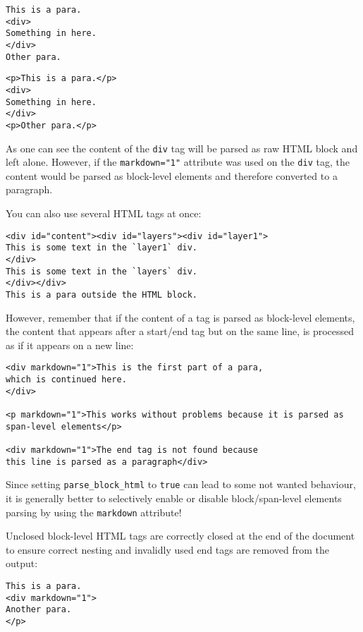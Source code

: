 \documentclass[a4paper]{article}
\begin{document}
\begin{verbatim}
This is a para.
<div>
Something in here.
</div>
Other para.
\end{verbatim}

\begin{verbatim}
<p>This is a para.</p>
<div>
Something in here.
</div>
<p>Other para.</p>
\end{verbatim}

As one can see the content of the \texttt{div} tag will be parsed as raw
HTML block and left alone. However, if the \texttt{markdown="1"}
attribute was used on the \texttt{div} tag, the content would be parsed
as block-level elements and therefore converted to a paragraph.

You can also use several HTML tags at once:

\begin{verbatim}
<div id="content"><div id="layers"><div id="layer1">
This is some text in the `layer1` div.
</div>
This is some text in the `layers` div.
</div></div>
This is a para outside the HTML block.
\end{verbatim}

However, remember that if the content of a tag is parsed as block-level
elements, the content that appears after a start/end tag but on the same
line, is processed as if it appears on a new line:

\begin{verbatim}
<div markdown="1">This is the first part of a para,
which is continued here.
</div>

<p markdown="1">This works without problems because it is parsed as
span-level elements</p>

<div markdown="1">The end tag is not found because
this line is parsed as a paragraph</div>
\end{verbatim}

Since setting \texttt{parse\_block\_html} to \texttt{true} can lead to
some not wanted behaviour, it is generally better to selectively enable
or disable block/span-level elements parsing by using the
\texttt{markdown} attribute!

Unclosed block-level HTML tags are correctly closed at the end of the
document to ensure correct nesting and invalidly used end tags are
removed from the output:

\begin{verbatim}
This is a para.
<div markdown="1">
Another para.
</p>
\end{verbatim}
\end{document}
